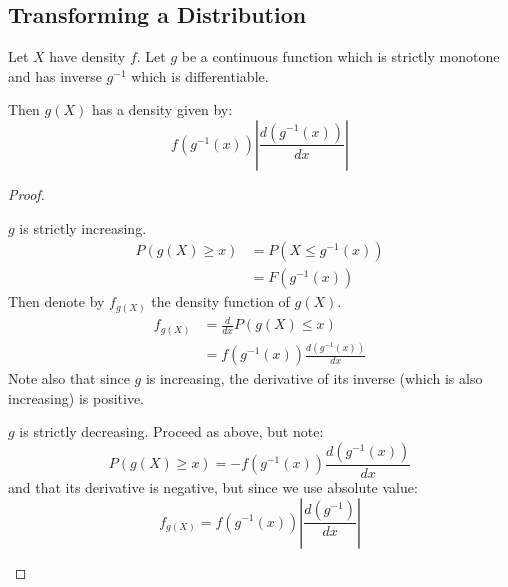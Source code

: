 \documentclass[../Main.tex]{subfiles}
\begin{document}
\subsection{Transforming a Distribution}
\begin{theorem}
    Let $X$ have density $f$. Let $g$ be a continuous function which is strictly monotone and has inverse $g^{-1}$ which is differentiable.\par
    Then $g(X)$ has a density given by:
    \begin{equation*}
        f(g^{-1}(x)) \left|\frac{d(g^{-1}(x))}{dx}\right|
    \end{equation*}
\end{theorem}
\begin{proof}
    \begin{case}{$g$ is strictly increasing.}
        \begin{align*}
            P(g(X) \geq x) &= P(X \leq g^{-1}(x)) \\
            &= F(g^{-1}(x))
        \end{align*} %
        Then denote by $f_{g(X)}$ the density function of $g(X)$.
        \begin{align*}
            f_{g(X)} &= \frac{d}{dx} P(g(X) \leq x) \\
            &= f(g^{-1}(x)) \frac{d(g^{-1}(x))}{dx}
        \end{align*}
        Note also that since $g$ is increasing, the derivative of its inverse (which is also increasing) is positive.
    \end{case}
    \begin{case}{$g$ is strictly decreasing.}
        Proceed as above, but note:
        \begin{equation*}
            P(g(X) \geq x) = -f(g^{-1}(x)) \frac{d(g^{-1}(x))}{dx}
        \end{equation*}
        and that its derivative is negative, but since we use absolute value:
        \begin{equation*}
            f_{g(X)} = f(g^{-1}(x)) \left|\frac{d(g^{-1})}{dx}\right|
        \end{equation*}
    \end{case}
\end{proof}
\end{document}
